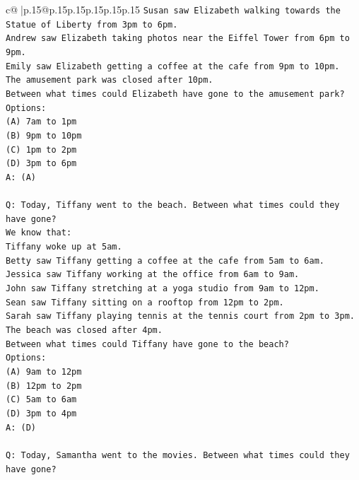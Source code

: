 \documentclass{article}
\begin{document}
{\begin{supertabular}{c@{$\;$}|p{.15\linewidth}@{}p{.15\linewidth}p{.15\linewidth}p{.15\linewidth}p{.15\linewidth}p{.15\linewidth}}
{{{\texttt{Susan saw Elizabeth walking towards the Statue of Liberty from 3pm to 6pm.} \\
\texttt{Andrew saw Elizabeth taking photos near the Eiffel Tower from 6pm to 9pm.} \\
\texttt{Emily saw Elizabeth getting a coffee at the cafe from 9pm to 10pm.} \\
\texttt{The amusement park was closed after 10pm.} \\
\texttt{Between what times could Elizabeth have gone to the amusement park?} \\
\texttt{Options:} \\
\texttt{(A) 7am to 1pm} \\
\texttt{(B) 9pm to 10pm} \\
\texttt{(C) 1pm to 2pm} \\
\texttt{(D) 3pm to 6pm} \\
\texttt{A: (A)} \\
\\ 
\texttt{Q: Today, Tiffany went to the beach. Between what times could they have gone?} \\
\texttt{We know that:} \\
\texttt{Tiffany woke up at 5am.} \\
\texttt{Betty saw Tiffany getting a coffee at the cafe from 5am to 6am.} \\
\texttt{Jessica saw Tiffany working at the office from 6am to 9am.} \\
\texttt{John saw Tiffany stretching at a yoga studio from 9am to 12pm.} \\
\texttt{Sean saw Tiffany sitting on a rooftop from 12pm to 2pm.} \\
\texttt{Sarah saw Tiffany playing tennis at the tennis court from 2pm to 3pm.} \\
\texttt{The beach was closed after 4pm.} \\
\texttt{Between what times could Tiffany have gone to the beach?} \\
\texttt{Options:} \\
\texttt{(A) 9am to 12pm} \\
\texttt{(B) 12pm to 2pm} \\
\texttt{(C) 5am to 6am} \\
\texttt{(D) 3pm to 4pm} \\
\texttt{A: (D)} \\
\\ 
\texttt{Q: Today, Samantha went to the movies. Between what times could they have gone?} \\
}}}
\end{supertabular}}
\end{document}
